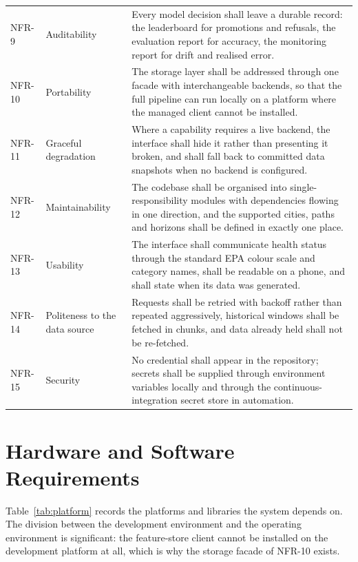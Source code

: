 \begin{xltabular}{\textwidth}{Q{1.6cm} P{2.9cm} Y}
NFR-9 & Auditability & Every model decision shall leave a durable record: the
leaderboard for promotions and refusals, the evaluation report for accuracy, the
monitoring report for drift and realised error. \\
NFR-10 & Portability & The storage layer shall be addressed through one facade
with interchangeable backends, so that the full pipeline can run locally on a
platform where the managed client cannot be installed. \\
NFR-11 & Graceful degradation & Where a capability requires a live backend, the
interface shall hide it rather than presenting it broken, and shall fall back to
committed data snapshots when no backend is configured. \\
NFR-12 & Maintainability & The codebase shall be organised into single-responsibility
modules with dependencies flowing in one direction, and the supported cities,
paths and horizons shall be defined in exactly one place. \\
NFR-13 & Usability & The interface shall communicate health status through the
standard EPA colour scale and category names, shall be readable on a phone, and
shall state when its data was generated. \\
NFR-14 & Politeness to the data source & Requests shall be retried with backoff
rather than repeated aggressively, historical windows shall be fetched in
chunks, and data already held shall not be re-fetched. \\
NFR-15 & Security & No credential shall appear in the repository; secrets shall
be supplied through environment variables locally and through the
continuous-integration secret store in automation. \\
\end{xltabular}

\section{Hardware and Software Requirements}
Table~\ref{tab:platform} records the platforms and libraries the system depends
on. The division between the development environment and the operating
environment is significant: the feature-store client cannot be installed on the
development platform at all, which is why the storage facade of NFR-10 exists.

